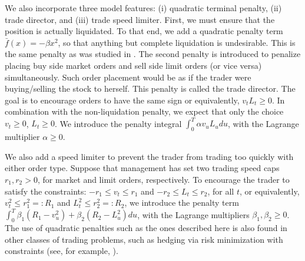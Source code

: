 \documentclass[12pt, letterpaper]{article}
\numberwithin{equation}{section}
\numberwithin{theorem}{section}
\begin{document}

We also incorporate three model features: (i) quadratic terminal penalty, (ii) trade director, and (iii) trade speed limiter. First, we must ensure that the position is actually liquidated. To that end, we add a quadratic penalty term $\bar{f}(x)=-\beta x^2$, so that anything but complete liquidation is undesirable. This is the same penalty as was studied in \cite{TaiHoACF}. The second penalty is introduced to penalize placing buy side market orders and sell side limit orders (or vice versa) simultaneously. Such order placement would be as if the trader were buying/selling the stock to herself. This penalty is called the trade director. The goal is to encourage orders to have the same sign or equivalently, $v_tL_t\ge0$. In combination with the non-liquidation penalty, we expect that only the choice $v_t\ge0$, $L_t\ge0$. We introduce   the penalty integral $\int_0^T \alpha v_u L_u du$, with the Lagrange multiplier $\alpha\ge0$. 

We also add a speed limiter to prevent  the trader from trading too quickly with either order type. Suppose that management has set two  trading speed caps $r_{1}, r_{2}>0$, for market and limit orders, respectively. To encourage the trader to satisfy the constraints: $-r_{1}\le v_t \le r_{1}$ and $-r_{2}\le L_t \le r_{2}$, for all $t$, or equivalently, $v_t^2 \le r_{1}^2=:R_1$ and  $L_t^2 \le r_{2}^2=:R_2$,   we introduce the penalty term  $\int_0^T \beta_1(R_1-v_u^2)+\beta_2(R_2-L_u^2) du$, with the Lagrange multipliers $\beta_1, \beta_2\ge0$. The use of quadratic penalties such as the ones described here is also found in other classes of trading problems, such as hedging  via risk minimization with constraints (see, for example, \cite{lee2008}). 
\end{document}

